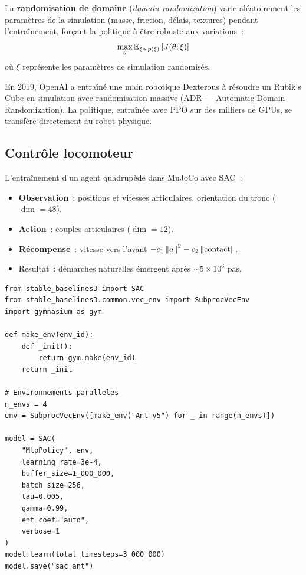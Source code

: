 \begin{definition}
La \textbf{randomisation de domaine} (\emph{domain randomization}) varie
al\'eatoirement les param\`etres de la simulation (masse, friction, d\'elais,
textures) pendant l'entra\^inement, for\c{c}ant la politique \`a \^etre robuste
aux variations~:
\[
    \max_\theta \mathbb{E}_{\xi \sim p(\xi)}\left[J(\theta; \xi)\right]
\]
o\`u $\xi$ repr\'esente les param\`etres de simulation randomis\'es.
\end{definition}

\begin{exemple}
En 2019, OpenAI a entra\^in\'e une main robotique Dexterous \`a r\'esoudre un
Rubik's Cube en simulation avec randomisation massive (ADR --- Automatic Domain
Randomization). La politique, entra\^in\'ee avec PPO sur des milliers de GPUs,
se transf\`ere directement au robot physique.
\end{exemple}

\subsection{Contr\^ole locomoteur}

\begin{exemple}
L'entra\^inement d'un agent quadrup\`ede dans MuJoCo avec SAC~:
\begin{itemize}
    \item \textbf{Observation}~: positions et vitesses articulaires, orientation du tronc ($\dim = 48$).
    \item \textbf{Action}~: couples articulaires ($\dim = 12$).
    \item \textbf{R\'ecompense}~: vitesse vers l'avant $- c_1 \left\| a \right\|^2 - c_2 \left\| \text{contact} \right\|$.
    \item R\'esultat~: d\'emarches naturelles \'emergent apr\`es $\sim 5 \times 10^6$ pas.
\end{itemize}
\end{exemple}

\begin{codeblock}[title=\textbf{Contr\^ole locomoteur avec SAC (Stable-Baselines3)}]
\begin{verbatim}
from stable_baselines3 import SAC
from stable_baselines3.common.vec_env import SubprocVecEnv
import gymnasium as gym

def make_env(env_id):
    def _init():
        return gym.make(env_id)
    return _init

# Environnements paralleles
n_envs = 4
env = SubprocVecEnv([make_env("Ant-v5") for _ in range(n_envs)])

model = SAC(
    "MlpPolicy", env,
    learning_rate=3e-4,
    buffer_size=1_000_000,
    batch_size=256,
    tau=0.005,
    gamma=0.99,
    ent_coef="auto",
    verbose=1
)
model.learn(total_timesteps=3_000_000)
model.save("sac_ant")
\end{verbatim}
\end{codeblock}

